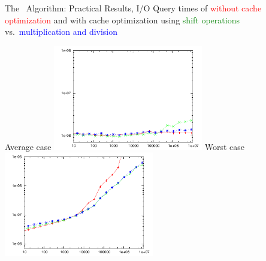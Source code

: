 \documentclass{beamer}
\begin{document}
\begin{frame}{The \fprintk\ Algorithm: Practical Results, I/O}
    Query times of \fprint[2]
    \textcolor{red}{without cache optimization}
    and with cache optimization using
    \textcolor{green}{shift operations} vs.\
    \textcolor{blue}{multiplication and division}
    \begin{multicols}{2}{
        \begin{center}
            Average case
            \includegraphics[width=0.49\textwidth,type=pdf,ext=.pdf,read=.pdf]{../src/results/length-slides-cache-fp2-rand10.plt}
            \newpage
            Worst case
            \includegraphics[width=0.49\textwidth,type=pdf,ext=.pdf,read=.pdf]{../src/results/length-slides-cache-fp2-alla.plt}
        \end{center}
    }
    \end{multicols}
\end{frame}
\end{document}
